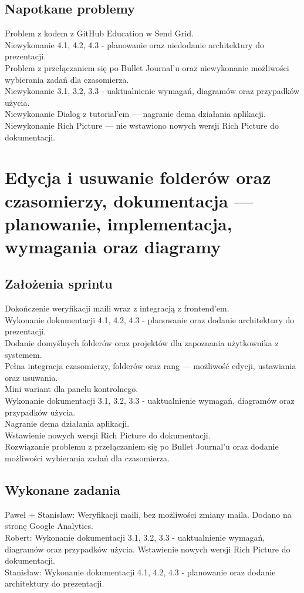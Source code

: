 \documentclass[a4paper,11pt]{report}
\begin{document}
\subsection {Napotkane problemy}
Problem z kodem z GitHub Education w Send Grid.\\
Niewykonanie 4.1, 4.2, 4.3 - planowanie oraz niedodanie architektury do prezentacji.\\
Problem z przełączaniem się po Bullet Journal'u oraz niewykonanie możliwości wybierania zadań dla czasomierza.\\
Niewykonanie 3.1, 3.2, 3.3 - uaktualnienie wymagań, diagramów oraz przypadków użycia.\\
Niewykonanie Dialog z tutorial'em — nagranie dema działania aplikacji.\\
Niewykonanie Rich Picture — nie wstawiono nowych wersji Rich Picture do dokumentacji.\\


\section {Edycja i usuwanie folderów oraz czasomierzy, dokumentacja — planowanie, implementacja, wymagania oraz diagramy}
\subsection {Założenia sprintu}
Dokończenie weryfikacji maili wraz z integracją z frontend'em.\\
Wykonanie dokumentacji 4.1, 4.2, 4.3 - planowanie oraz dodanie architektury do prezentacji.\\
Dodanie domyślnych folderów oraz projektów dla zapoznania użytkownika z systemem.\\
Pełna integracja czasomierzy, folderów oraz rang — możliwość edycji, ustawiania oraz usuwania.\\
Mini wariant dla panelu kontrolnego.\\
Wykonanie dokumentacji 3.1, 3.2, 3.3 - uaktualnienie wymagań, diagramów oraz przypadków użycia.\\
Nagranie dema działania aplikacji.\\
Wstawienie nowych wersji Rich Picture do dokumentacji.\\
Rozwiązanie problemu z przełączaniem się po Bullet Journal'u oraz dodanie możliwości wybierania zadań dla czasomierza.\\
\subsection {Wykonane zadania}
Paweł + Stanisław: Weryfikacji maili, bez możliwości zmiany maila. Dodano na stronę Google Analytics.\\
Robert: Wykonanie dokumentacji 3.1, 3.2, 3.3 - uaktualnienie wymagań, diagramów oraz przypadków użycia. Wstawienie nowych wersji Rich Picture do dokumentacji.\\
Stanisław: Wykonanie dokumentacji 4.1, 4.2, 4.3 - planowanie oraz dodanie architektury do prezentacji.\\
\end{document}
